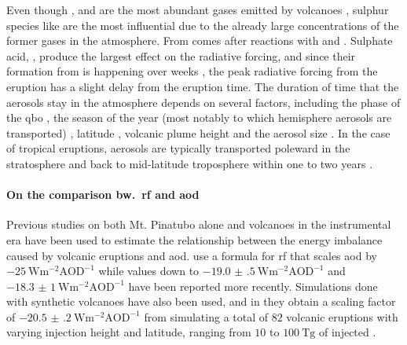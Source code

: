 \documentclass{ametsocV5}
\newcommand{\iso}[1][i]{{#1}njected \ce{SO2}}
\begin{document}
Even though ,  and  are the most abundant gases emitted by
volcanoes \citep{robock2000}, sulphur species like  are the most influential due
to the already large concentrations of the former gases in the atmosphere. From 
comes  after reactions with  and  \citep{robock2000}. Sulphate
acid, , produce the largest effect on the radiative forcing, and since their
formation from  is happening over weeks \citep{robock2000}, the peak radiative
forcing from the eruption has a slight delay from the eruption time. The duration of
time that the  aerosols stay in the atmosphere depends on several factors,
including the phase of the \acrshort{qbo} \citep{pitari2016b}, the season of the year
(most notably to which hemisphere aerosols are transported)
\citep{toohey2011,toohey2019}, latitude \citep{marshall2019,toohey2019}, volcanic plume
height \citep{marshall2019} and the aerosol size \citep{marshall2019}. In the case of
tropical eruptions, aerosols are typically transported poleward in the stratosphere and
back to mid-latitude troposphere within one to two years \citep{robock2000}.


\paragraph*{On the comparison bw.\ \acrshort{rf} and \acrshort{aod}}

Previous studies on both Mt. Pinatubo alone \citep{mills2017,hansen2005} and volcanoes
in the instrumental era \citep{gregory2016} have been used to estimate the relationship
between the energy imbalance caused by volcanic eruptions and \acrshort{aod}.
\citet{myhre2013} use a formula for \acrshort{rf} that scales \acrshort{aod} by
\(\SI{-25}{\watt\metre^{-2}\mathrm{AOD}^{-1}}\) while values down to
\(\SI{-19.0(5)}{\watt\metre^{-2}\mathrm{AOD}^{-1}}\) \citep{gregory2016} and
\(\SI{-18.3(10)}{\watt\metre^{-2}\mathrm{AOD}^{-1}}\) \citep{mills2017} have been
reported more recently. Simulations done with synthetic volcanoes have also been used,
and in \citet{marshall2020} they obtain a scaling factor of
\(\SI{-20.5(2)}{\watt\metre^{-2}\mathrm{AOD}^{-1}}\) from simulating a total of \(82\)
volcanic eruptions with varying injection height and latitude, ranging from \(10\) to
\(\SI{100}{\tera\gram}\) of \iso{}.
\end{document}
